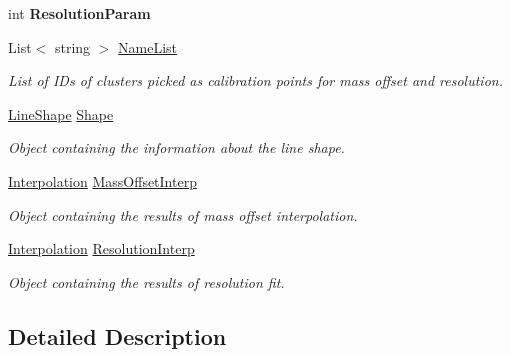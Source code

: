 \begin{DoxyCompactItemize}
int {\bfseries Resolution\+Param}
\item 
List$<$ string $>$ \hyperlink{class_isotope_fit_1_1_i_f_data_1_1_calibration_a2e347f087df878f22010302bda7db4be}{Name\+List}
\begin{DoxyCompactList}\small\item\em List of I\+Ds of clusters picked as calibration points for mass offset and resolution. \end{DoxyCompactList}\item 
\hyperlink{class_isotope_fit_1_1_i_f_data_1_1_calibration_1_1_line_shape}{Line\+Shape} \hyperlink{class_isotope_fit_1_1_i_f_data_1_1_calibration_ad0c3e0969448ad0cc57307c77c2222eb}{Shape}
\begin{DoxyCompactList}\small\item\em Object containing the information about the line shape. \end{DoxyCompactList}\item 
\hyperlink{class_isotope_fit_1_1_interpolation}{Interpolation} \hyperlink{class_isotope_fit_1_1_i_f_data_1_1_calibration_af383c1c97a369e786e72ac5d79e8973e}{Mass\+Offset\+Interp}
\begin{DoxyCompactList}\small\item\em Object containing the results of mass offset interpolation. \end{DoxyCompactList}\item 
\hyperlink{class_isotope_fit_1_1_interpolation}{Interpolation} \hyperlink{class_isotope_fit_1_1_i_f_data_1_1_calibration_ab8db2fa10ee3de8f8deca251f4bd3518}{Resolution\+Interp}
\begin{DoxyCompactList}\small\item\em Object containing the results of resolution fit. \end{DoxyCompactList}\end{DoxyCompactItemize}


\subsection{Detailed Description}


